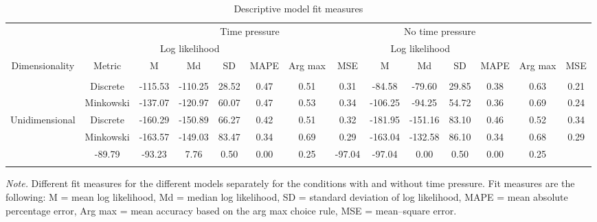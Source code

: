 \documentclass[a4paper,man,natbib]{apa6}
\begin{document}
\begin{table}
\begin{center}
\begin{threeparttable}
\caption{Descriptive model fit measures}
\begin{tabular}{cccccccccccccc}
\toprule
 &  & \multicolumn{6}{c}{Time pressure} & \multicolumn{4}{c}{No time pressure}\\
\cmidrule(r){3-8} \cmidrule(r){9-14}
 &  & \multicolumn{3}{c}{Log likelihood} & & & & \multicolumn{3}{c}{Log likelihood} & & & \\
\cmidrule(r){3-5} \cmidrule(r){9-11}
Dimensionality & \multicolumn{1}{c}{Metric} & \multicolumn{1}{c}{M} & \multicolumn{1}{c}{Md} & \multicolumn{1}{c}{SD} & \multicolumn{1}{c}{MAPE} & \multicolumn{1}{c}{Arg max} & \multicolumn{1}{c}{MSE} & \multicolumn{1}{c}{M} & \multicolumn{1}{c}{Md} & \multicolumn{1}{c}{SD} & \multicolumn{1}{c}{MAPE} & \multicolumn{1}{c}{Arg max} & \multicolumn{1}{c}{MSE}\\
\midrule
\addlinespace
\multicolumn{2}{c}{\emph{Generalized Context Model}} \\
\addlinespace
\multirow{2}{*}{Multidimensional} & Discrete & -115.53 & -110.25 & 28.52 & 0.47 & 0.51 & 0.31 & -84.58 & -79.60 & 29.85 & 0.38 & 0.63 & 0.21\\
 & Minkowski & -137.07 & -120.97 & 60.07 & 0.47 & 0.53 & 0.34 & -106.25 & -94.25 & 54.72 & 0.36 & 0.69 & 0.24\\
\multirow{2}{*}{Unidimensional} & Discrete & -160.29 & -150.89 & 66.27 & 0.42 & 0.51 & 0.32 & -181.95 & -151.16 & 83.10 & 0.46 & 0.52 & 0.34\\
 & Minkowski & -163.57 & -149.03 & 83.47 & 0.34 & 0.69 & 0.29 & -163.04 & -132.58 & 86.10 & 0.34 & 0.68 & 0.29\\
\addlinespace
\multicolumn{2}{c}{\emph{Random--Choice Model}} & -89.79 & -93.23 & 7.76 & 0.50 & 0.00 & 0.25 & -97.04 & -97.04 & 0.00 & 0.50 & 0.00 & 0.25\\
\bottomrule
\addlinespace
\end{tabular}
\begin{tablenotes}[para]
\textit{Note.} Different fit measures for the different models separately for the conditions with and without time pressure. 
          Fit measures are the following: M = mean log likelihood, Md = median log likelihood, SD = standard deviation of log likelihood, MAPE = mean absolute percentage error, Arg max = mean accuracy based on the arg max choice rule, MSE = mean--square error.
\end{tablenotes}
\end{threeparttable}
\end{center}
\end{table}
\end{document}
